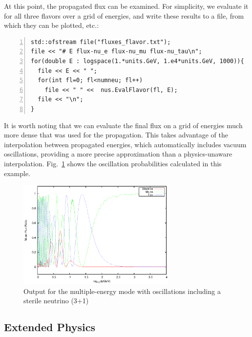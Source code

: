 \documentclass[3p,12pt]{elsarticle}
\begin{document}
At this point, the propagated flux can be examined. 
For simplicity, we evaluate it for all three flavors over a grid of energies, and write these results to a file, from which they can be plotted, etc.:
\begin{lstlisting}[frame=leftline, numbers=left, breaklines=true, firstnumber=last]
std::ofstream file("fluxes_flavor.txt");
file << "# E flux-nu_e flux-nu_mu flux-nu_tau\n";
for(double E : logspace(1.*units.GeV, 1.e4*units.GeV, 1000)){
  file << E << " ";
  for(int fl=0; fl<numneu; fl++)
    file << " " <<  nus.EvalFlavor(fl, E);
  file << "\n";
}
\end{lstlisting}
It is worth noting that we can evaluate the final flux on a grid of energies much more dense that was used for the propagation. 
This takes advantage of the interpolation between propagated energies, which automatically includes vacuum oscillations, providing a more precise approximation than a physics-unaware interpolation. 
Fig.~\ref{fig:short_multimode} shows the oscillation probabilities calculated in this example.

\begin{figure}[h]
  \label{fig:short_multimode}
  \centering
  \includegraphics[width=0.7\textwidth]{fig/Multiplot.eps} 
  \caption{Output for the multiple-energy mode with oscillations including a sterile neutrino (3+1)} 
\end{figure}

\subsection{Extended Physics}
\end{document}
